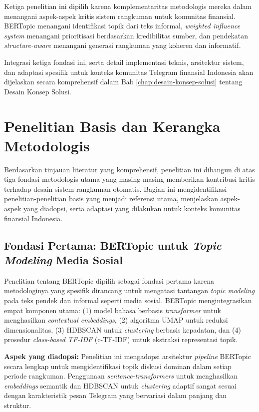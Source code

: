 Ketiga penelitian ini dipilih karena komplementaritas metodologis mereka dalam menangani aspek-aspek kritis sistem rangkuman untuk komunitas finansial. BERTopic menangani identifikasi topik dari teks informal, \textit{weighted influence system} menangani prioritisasi berdasarkan kredibilitas sumber, dan pendekatan \textit{structure-aware} menangani generasi rangkuman yang koheren dan informatif.

Integrasi ketiga fondasi ini, serta detail implementasi teknis, arsitektur sistem, dan adaptasi spesifik untuk konteks komunitas Telegram finansial Indonesia akan dijelaskan secara komprehensif dalam Bab \ref{chap:desain-konsep-solusi} tentang Desain Konsep Solusi.


\section{Penelitian Basis dan Kerangka Metodologis}
\label{sec:research-foundation}

Berdasarkan tinjauan literatur yang komprehensif, penelitian ini dibangun di atas tiga fondasi metodologis utama yang masing-masing memberikan kontribusi kritis terhadap desain sistem rangkuman otomatis. Bagian ini mengidentifikasi penelitian-penelitian basis yang menjadi referensi utama, menjelaskan aspek-aspek yang diadopsi, serta adaptasi yang dilakukan untuk konteks komunitas finansial Indonesia.

\subsection{Fondasi Pertama: BERTopic untuk \textit{Topic Modeling} Media Sosial}

Penelitian \textcite{grootendorst2022} tentang BERTopic dipilih sebagai fondasi pertama karena metodologinya yang spesifik dirancang untuk mengatasi tantangan \textit{topic modeling} pada teks pendek dan informal seperti media sosial. BERTopic mengintegrasikan empat komponen utama: (1) model bahasa berbasis \textit{transformer} untuk menghasilkan \textit{contextual embeddings}, (2) algoritma UMAP untuk reduksi dimensionalitas, (3) HDBSCAN untuk \textit{clustering} berbasis kepadatan, dan (4) prosedur \textit{class-based TF-IDF} (c-TF-IDF) untuk ekstraksi representasi topik.

\textbf{Aspek yang diadopsi:} Penelitian ini mengadopsi arsitektur \textit{pipeline} BERTopic secara lengkap untuk mengidentifikasi topik diskusi dominan dalam setiap periode rangkuman. Penggunaan \textit{sentence-transformers} untuk menghasilkan \textit{embeddings} semantik dan HDBSCAN untuk \textit{clustering} adaptif sangat sesuai dengan karakteristik pesan Telegram yang bervariasi dalam panjang dan struktur.

